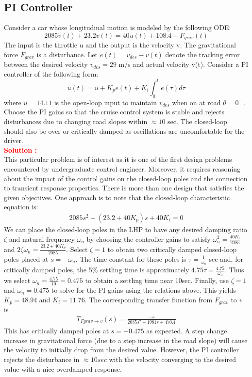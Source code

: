 \documentclass[12pt]{article}
\begin{document}
\subsection{PI Controller}

Consider a car whose longitudinal motion is modeled by the following ODE:
$$2085 \dot{v}(t) + 23.2v(t) = 40u(t) + 108.4 - F_{grav}(t)$$
The input is the throttle u and the output is the velocity v. The gravitational force $F_{grav}$ is a disturbance. Let $e(t) = v_{des}- v(t)$ denote the tracking error between the desired velocity $v_{des} = 29$ m/s and actual velocity v(t). Consider a PI controller of the following form:
$$ u(t) =  \bar{u} + K_p e(t) + K_i \int_0^t  e(\tau) d\tau  $$
where $\bar{u}=14.11$ is the open-loop input to maintain $v_{des}$ when on 
at road $\theta= 0^\circ$ . Choose the PI gains so that the cruise control system is stable and rejects disturbances due to changing road slopes within $\approx 10$ sec. The closed-loop should also be over or critically damped as oscillations are uncomfortable for the driver. \\
\textbf{\textcolor{red}{Solution :}} \\
This particular problem is of interest as it is one of the first design problems encountered by undergraduate control engineer. Moreover, it requires reasoning about the impact of the control gains on the closed-loop poles and the connection to transient response properties. There is more than one design that satisfies the given objectives.  One approach is to note that the closed-loop characteristic equation is:
\begin{align*}
 2085 s^2 + (23.2 + 40K_p) s + 40K_i =0
\end{align*}
We can place the closed-loop poles in the LHP to have any desired damping ratio $\zeta$ and natural frequency $\omega_n$ by choosing the controller gains to satisfy $\omega_n^2 = \frac{40K_i}{2085}$
and $2\zeta\omega_n = \frac{23.2+40K_p}{2085}$.  Select $\zeta=1$ to obtain two critically damped closed-loop poles placed at $s=-\omega_n$. The time constant for these poles is $\tau=\frac{1}{\omega_n}$ sec and, for critically damped poles, the 5\% settling time is approximately $4.75\tau = \frac{4.75}{\omega_n}$.  Thus we select $\omega_n = \frac{4.75}{10} = 0.475$ to obtain a settling time near 10sec.  Finally, use $\zeta=1$ and $\omega_n=0.475$ to solve for the PI gains using the relations above. This yields $K_p=48.94$ and $K_i=11.76$.  The corresponding transfer function from $F_{grav}$ to $v$ is
\begin{align*}
    T_{Fgrav \to v}(s) = \frac{-s}{2085 s^2 + 1981 s + 470.4}
\end{align*}
This has critically damped poles at $s=-0.475$ as expected. A step change increase in gravitational force (due to a step increase in the road slope) will cause the velocity to initially drop from the desired value.  However, the PI controller rejects the disturbance in $\approx 10sec$ with the velocity converging to the desired value with a nice overdamped response.
\clearpage
\end{document}
